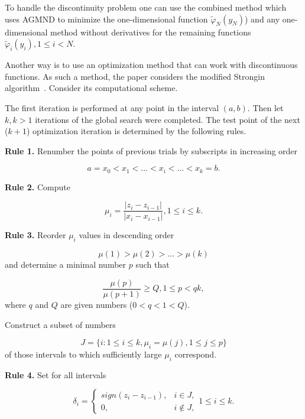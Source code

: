 \documentclass[runningheads]{llncs}
\begin{document}
To handle the discontinuity problem one can use the combined method which uses AGMND to minimize the one-dimensional function $\widetilde{\varphi}_N(y_N)$) and any one-dimensional method without derivatives for the remaining functions $\widetilde{\varphi}_i(y_i), 1 \le i < N$.

Another way is to use an optimization method that can work with discontinuous functions. As such a method, the paper considers the modified Strongin algorithm~\cite{Strongin1990}. Consider its computational scheme.

The first iteration is performed at any point in the interval $(a, b)$. Then let $k, k > 1$ iterations of the global search were completed. The test point of the next ($k+1$) optimization iteration is determined by the following rules.

\textbf{Rule 1.} Renumber the points of previous trials by subscripts in increasing order

\begin{equation}
a = x_0 < x_1 < \ldots < x_i < \ldots < x_k = b.
\end{equation}

\textbf{Rule 2.} Compute

\begin{equation}
\mu_i = \frac{|z_i-z_{i-1}|}{|x_i-x_{i-1}|}, 1 \le i \le k.
\end{equation}

\textbf{Rule 3.} Reorder $\mu_i$ values in descending order

\begin{equation}
\mu(1) > \mu(2) > \ldots > \mu(k)
\end{equation}
and determine a minimal number $p$ such that 

\begin{equation}\label{eq:p}
\frac{\mu(p)}{\mu(p+1)} \ge Q, 1 \le p < qk,
\end{equation}
where $q$ and $Q$ are given numbers ($0 < q < 1 < Q$). 

Construct a subset of numbers

\begin{equation}
J = \{i: 1 \le i \le k, \mu_i = \mu(j), 1 \le j \le p \}
\end{equation}
of those intervals to which sufficiently large $\mu_i$ correspond.

\textbf{Rule 4.} Set for all intervals

\begin{equation}
\delta_i = \left\{
\begin{array}{ll}
sign(z_i-z_{i-1}), & i \in J, \\
0, & i \notin J,
\end{array}
\right. 1 \le i \le k.
\end{equation}
\end{document}
